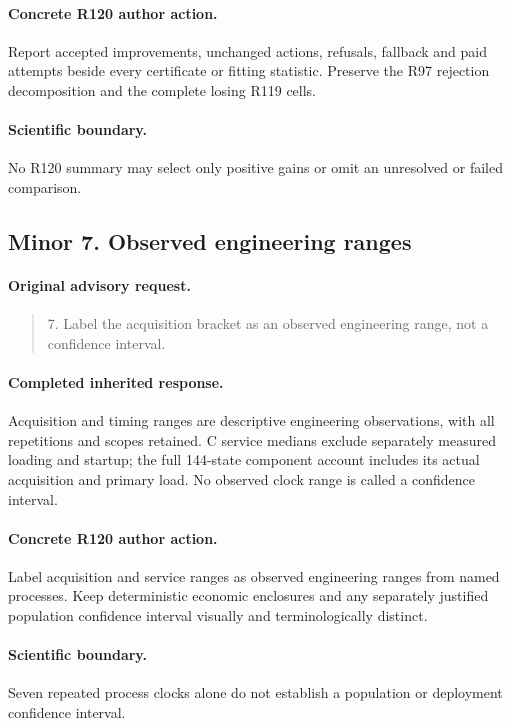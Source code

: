 \paragraph{Concrete R120 author action.}
Report accepted improvements, unchanged actions, refusals, fallback and paid attempts beside every certificate or fitting statistic. Preserve the R97 rejection decomposition and the complete losing R119 cells.
\paragraph{Scientific boundary.}
No R120 summary may select only positive gains or omit an unresolved or failed comparison.

\subsection{Minor 7. Observed engineering ranges}
\label{response120:minor-7}
\paragraph{Original advisory request.}
\begin{quote}
7. Label the acquisition bracket as an observed engineering range, not a confidence interval.
\end{quote}
\paragraph{Completed inherited response.}
Acquisition and timing ranges are descriptive engineering observations, with all repetitions and scopes retained. C service medians exclude separately measured loading and startup; the full 144-state component account includes its actual acquisition and primary load. No observed clock range is called a confidence interval.
\paragraph{Concrete R120 author action.}
Label acquisition and service ranges as observed engineering ranges from named processes. Keep deterministic economic enclosures and any separately justified population confidence interval visually and terminologically distinct.
\paragraph{Scientific boundary.}
Seven repeated process clocks alone do not establish a population or deployment confidence interval.

